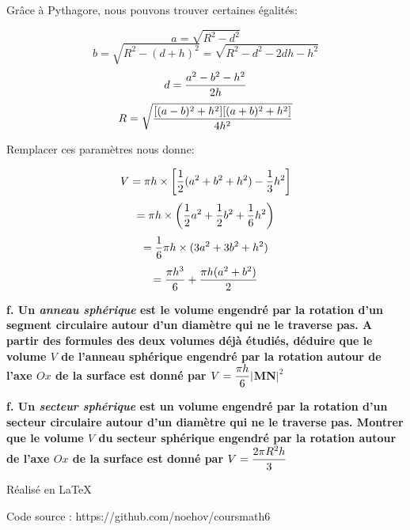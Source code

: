 \documentclass[10pt]{article}
\begin{document}
Grâce à Pythagore, nous pouvons trouver certaines égalités:

$$a=\sqrt{R^2-d^2}$$
$$b=\sqrt{R^2-(d+h)^2} = \sqrt{R^2-d^2-2dh-h^2}$$
$$d={a^2-b^2-h^2\over{2h}}$$
$$R= \sqrt{{[(a-b)^2+h^2][(a+b)^2+h^2]\over{4h^2}}}$$\vspace{0.1cm}

Remplacer ces paramètres nous donne:

$$V = \pi h \times \left[{1\over{2}}(a^2+b^2+h^2)-{1\over{3}}h^2 \right]$$
$$= \pi h \times \left( {1\over{2}}a^2 + {1\over{2}}b^2 + {1\over{6}}h^2 \right)$$
$$={1\over{6}} \pi h \times (3a^2 + 3b^2 + h^2 )$$
$$={\pi h^3\over{6}} + {\pi h (a^2+b^2)\over{2}}$$



















\newpage
\flushleft \textbf{f. Un \textit{anneau sphérique} est le volume engendré par la rotation d'un segment circulaire autour d'un diamètre qui ne le traverse pas. A partir des formules des deux volumes déjà étudiés, déduire que le volume $V$ de l'anneau sphérique engendré par la rotation autour de l'axe $Ox$ de la surface est donné par $\displaystyle{V={\pi h\over{6}}|}$MN$\displaystyle{|^2}$}\vspace{0.5cm}

\newpage
\flushleft \textbf{f. Un \textit{secteur sphérique} est un volume engendré par la rotation d'un secteur circulaire autour d'un diamètre qui ne le traverse pas. Montrer que le volume $V$ du secteur sphérique engendré par la rotation autour de l'axe $Ox$ de la surface est donné par $\displaystyle{V={2\pi R^2 h \over{3}}}$}

\begin{center}

\vspace{1cm}Réalisé en \LaTeX\vspace{0.2cm}

Code source : https://github.com/noehov/coursmath6

\end{center}
\end{document}
